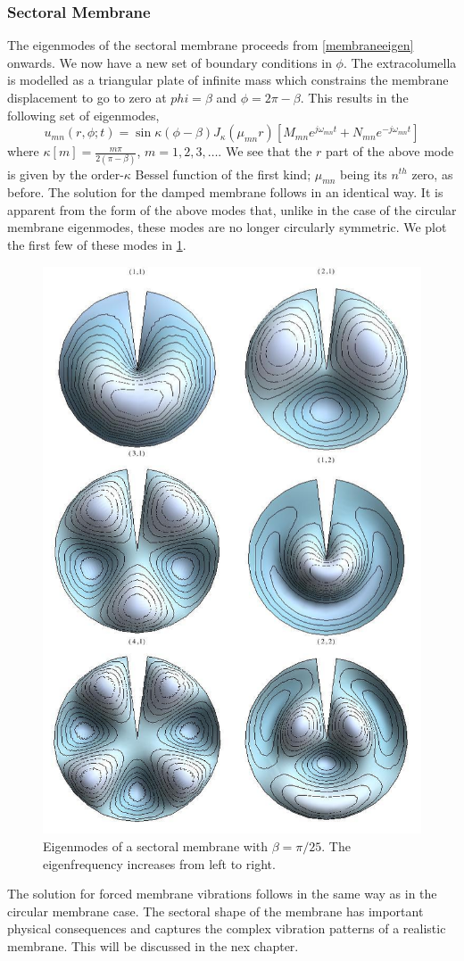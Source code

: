 \subsubsection{Sectoral Membrane}
The eigenmodes of the sectoral membrane proceeds from \eqref{membraneeigen} onwards. We now have a new set of boundary conditions in $\phi$.
The extracolumella is modelled as a triangular plate of infinite mass which constrains the membrane displacement to go to zero at $phi=\beta$
and $\phi=2\pi-\beta$. This results in the following set of eigenmodes,
\begin{equation}\label{sectoraleigenmode}
 u_{mn}(r,\phi;t)=\sin \kappa(\phi-\beta) J_\kappa(\mu_{mn} r)\left[M_{mn}e^{j\omega_{mn} t}+N_{mn}e^{-j\omega_{mn} t}\right]
\end{equation}
where $\kappa[m]=\frac{m\pi}{2(\pi-\beta)}$, $m=1,2,3,\ldots$. We see that the $r$ part of the above mode is given by the
order-$\kappa$ Bessel function of the first kind; $\mu_{mn}$ being its $n^{th}$ zero, as before. The solution for the damped
membrane follows in an identical way.
It is apparent from the form of the above modes that, unlike in the case of the circular membrane eigenmodes, these modes
are no longer circularly symmetric. We plot the first few of these modes in \ref{sectoralmembraneeigenmodes}. 
\begin{figure}[ht!]
 \centering
 \includegraphics[width=.6\linewidth]{Diagrams/SectorMembraneModes/membrane_modes_all.png}
 \caption[Sectoral membrane eigenmodes]{Eigenmodes of a sectoral membrane with $\beta=\pi/25$. The eigenfrequency increases from left to right.}
  \label{sectoralmembraneeigenmodes}
\end{figure}
The solution for forced membrane vibrations follows in the same way as in the circular membrane case. The sectoral shape of the membrane has important
physical consequences and captures the complex vibration patterns of a realistic membrane. This will be discussed in the nex chapter.
